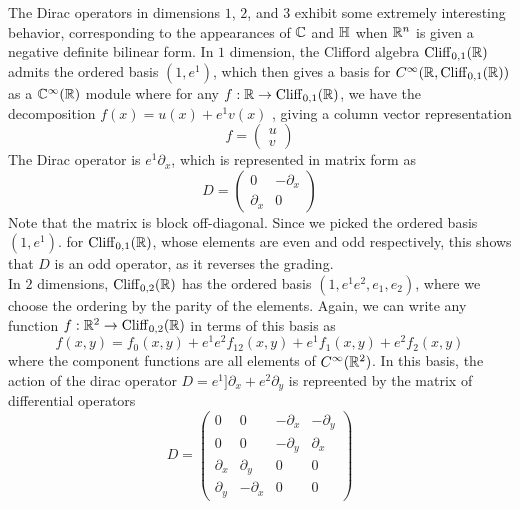 The Dirac operators in dimensions $1$, $2$, and $3$ exhibit some extremely
interesting behavior, corresponding to the appearances of $\mathbb{C}$ and $\mathbb{H}$
when $\mathbb{R}^n$ is given a negative definite bilinear form. In $1$ dimension,
the Clifford algebra $\operatorname{Cliff}_{0,1}(\mathbb{R})$ admits the ordered basis $(1,e^1)$, which
then gives a basis for $C^\infty(\mathbb{R}, \operatorname{Cliff}_{0,1}(\mathbb{R}))$ as a
$\mathbb{C}^\infty(\mathbb{R})$ module where for any $f : \mathbb{R} \to \operatorname{Cliff}_{0,1}(\mathbb{R})$, we have the
decomposition $f(x) = u(x) + e^1 v(x)$ , giving a column vector representation
\[
f = \begin{pmatrix}
u \\
v
\end{pmatrix}
\]
The Dirac operator is $e^1\partial_x$, which is represented in matrix form as
\[
D = \begin{pmatrix}
0 & -\partial_x \\
\partial_x & 0
\end{pmatrix}
\]
Note that the matrix is block off-diagonal. Since we picked the ordered basis $(1,e^1)$.
for $\operatorname{Cliff}_{0,1}(\mathbb{R})$, whose elements are even and odd respectively, this
shows that $D$ is an odd operator, as it reverses the grading. \\

In $2$ dimensions, $\operatorname{Cliff}_{0,2}(\mathbb{R})$ has the ordered basis $(1, e^1e^2, e_1,e_2)$,
where we choose the ordering by the parity of the elements. Again, we can
write any function $f : \mathbb{R}^2 \to \operatorname{Cliff}_{0,2}(\mathbb{R})$ in terms of this basis
as \[
f(x,y) = f_0(x,y) + e^1e^2f_{12}(x,y) + e^1f_1(x,y) + e^2f_2(x,y)
\]
where the component functions are all elements of $C^\infty(\mathbb{R}^2)$. In this
basis, the action of the dirac operator $D = e^1]\partial_x + e^2\partial_y$
is repreented by the matrix of differential operators
\[
D = \begin{pmatrix}
0 & 0 & -\partial_x & -\partial_y \\
0 & 0 & -\partial_y & \partial_x \\
\partial_x & \partial_y & 0 & 0 \\
\partial_y & -\partial_x & 0 & 0
\end{pmatrix}
\]
%
%